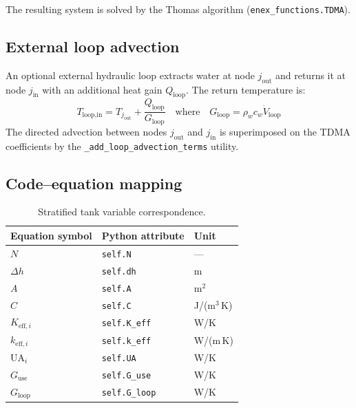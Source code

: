 The resulting system is solved by the Thomas algorithm (\texttt{enex\_functions.TDMA}).

\subsection{External loop advection}

An optional external hydraulic loop extracts water at node $j_\text{out}$ and returns it at node $j_\text{in}$ with an additional heat gain $Q_\text{loop}$. The return temperature is:
\begin{equation}\label{eq:tank-Tloop}
  T_\text{loop,in} = T_{j_\text{out}} + \frac{Q_\text{loop}}{G_\text{loop}}
  \quad\text{where}\quad G_\text{loop} = \rho_w c_w \dot{V}_\text{loop}
\end{equation}
The directed advection between nodes $j_\text{out}$ and $j_\text{in}$ is superimposed on the TDMA coefficients by the \texttt{\_add\_loop\_advection\_terms} utility.

\subsection{Code--equation mapping}

\begin{table}[h!]
\centering
\caption{Stratified tank variable correspondence.}
\label{tab:tank-mapping}
\begin{tabular}{@{}lll@{}}
\toprule
Equation symbol & Python attribute & Unit \\
\midrule
$N$                   & \texttt{self.N}        & --- \\
$\Delta h$            & \texttt{self.dh}       & m   \\
$A$                   & \texttt{self.A}        & m$^2$ \\
$C$                   & \texttt{self.C}        & J/(m$^3$\,K) \\
$K_{\text{eff},i}$    & \texttt{self.K\_eff}   & W/K \\
$k_{\text{eff},i}$    & \texttt{self.k\_eff}   & W/(m\,K) \\
$\text{UA}_i$         & \texttt{self.UA}       & W/K \\
$G_\text{use}$        & \texttt{self.G\_use}   & W/K \\
$G_\text{loop}$       & \texttt{self.G\_loop}  & W/K \\
\bottomrule
\end{tabular}
\end{table}
